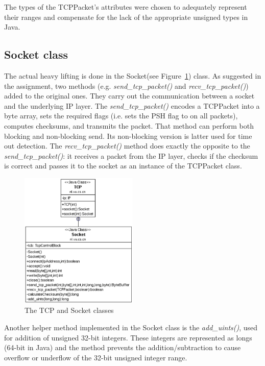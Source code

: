 \documentclass{article}
\begin{document}
\noindent
The types of the TCPPacket's attributes were chosen to adequately represent their ranges and compensate
for the lack of the appropriate unsigned types in Java.
  
\subsection{Socket class}
The actual heavy lifting is done in the Socket(see Figure~\ref{fig:socket}) class. As suggested in the assignment, two methods 
(e.g. \textit{send\_tcp\_packet()} and \textit{recv\_tcp\_packet()}) added to the original ones. They carry out the communication
between a socket and the underlying IP layer. The \textit{send\_tcp\_packet()} encodes a TCPPacket into a byte array,
sets the required flags (i.e. sets the PSH flag to on all packets), computes checksums, and transmits the
packet. That method can perform both blocking and non-blocking send. Its non-blocking version is latter 
used for time out detection. The \textit{recv\_tcp\_packet()} method does exactly the opposite to the \textit{send\_tcp\_packet()}:
it receives a packet from the IP layer, checks if the checksum is correct and passes it to the socket
as an instance of the TCPPacket class.


\begin{figure}[h!]
 \centering
 \includegraphics[width=0.5\textwidth]{images/tcp_socket}
 \caption{The TCP and Socket classes}
  \label{fig:socket}
\end{figure}

Another helper method implemented in the Socket class is the \textit{add\_uints()}, used for addition of unsigned 32-bit
integers. These integers are represented as longs (64-bit in Java) and the method prevents the addition/subtraction to
cause overflow or underflow of the 32-bit unsigned integer range.
\end{document}
